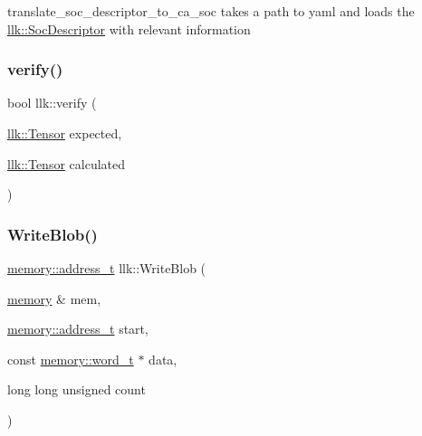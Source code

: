 translate\+\_\+soc\+\_\+descriptor\+\_\+to\+\_\+ca\+\_\+soc takes a path to yaml and loads the \hyperlink{structllk_1_1SocDescriptor}{llk\+::\+Soc\+Descriptor} with relevant information 

\mbox{\label{namespacellk_a4177b29d9834c7885389009539d644d5}} 
\subsubsection{\texorpdfstring{verify()}{verify()}}
{\footnotesize\ttfamily bool llk\+::verify (\begin{DoxyParamCaption}\item[{\hyperlink{classllk_1_1Tensor}{llk\+::\+Tensor}}]{expected,  }\item[{\hyperlink{classllk_1_1Tensor}{llk\+::\+Tensor}}]{calculated }\end{DoxyParamCaption})}

\mbox{\label{namespacellk_af632f3a3bce5453659e5ba431edd703b}} 
\subsubsection{\texorpdfstring{Write\+Blob()}{WriteBlob()}\hspace{0.1cm}{\footnotesize\ttfamily [1/2]}}
{\footnotesize\ttfamily \hyperlink{classllk_1_1memory_ae7a4b897aa999f22e250dc8e4d773dec}{memory\+::address\+\_\+t} llk\+::\+Write\+Blob (\begin{DoxyParamCaption}\item[{\hyperlink{classllk_1_1memory}{memory} \&}]{mem,  }\item[{\hyperlink{classllk_1_1memory_ae7a4b897aa999f22e250dc8e4d773dec}{memory\+::address\+\_\+t}}]{start,  }\item[{const \hyperlink{classllk_1_1memory_a432a6c0ae1bcb9c44d79cfa1a239419c}{memory\+::word\+\_\+t} $\ast$}]{data,  }\item[{long long unsigned}]{count }\end{DoxyParamCaption})\hspace{0.3cm}{\ttfamily [inline]}}

\mbox{\label{namespacellk_a03eaff131f928d8e762175c51ced8fb9}} 
